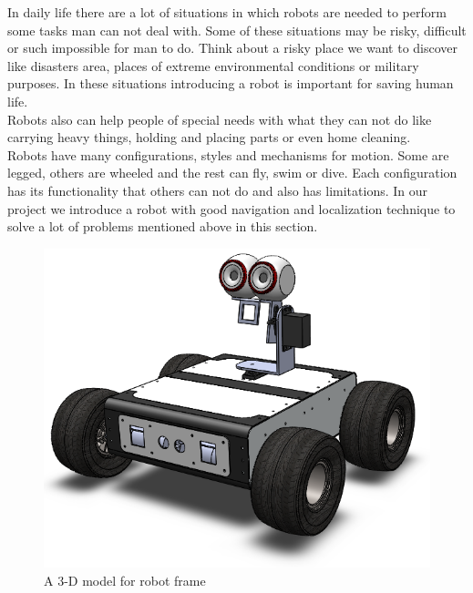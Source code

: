 \documentclass[12pt]{article}
\begin{document}
 In daily life there are a lot of situations in which robots are needed to perform some tasks man can not deal with. Some of these situations may be risky, difficult or such impossible for man to do. Think about a risky place we want to discover like disasters area, places of extreme environmental conditions or military purposes. In these situations introducing a robot is important for saving human life.\\
 Robots also can help people of special needs with what they can not do like carrying heavy things, holding and placing parts or even home cleaning.\\
 Robots have many configurations, styles and mechanisms for motion. Some are legged, others are wheeled and the rest can fly, swim or dive. Each configuration has its functionality that others can not do and also has limitations.
 In our project we introduce a robot with good navigation and localization technique to solve a lot of problems mentioned above in this section. 

\begin{figure}[h]
\centering
\includegraphics[width =.4\textwidth]{Fig/Introduction.png}
\caption{ A 3-D model for robot frame}
\end{figure}

\end{document}
